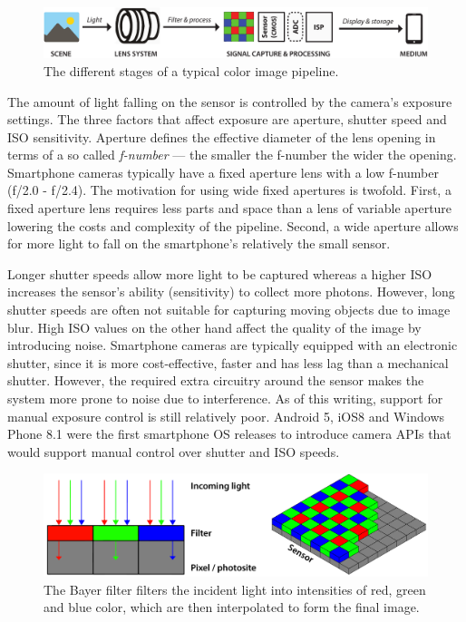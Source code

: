 \documentclass[thesis.tex]{subfiles}
\begin{document}
\begin{figure}[ht]
\centering \includegraphics[width=\textwidth]{images/pipeline}
\caption{The different stages of a typical color image pipeline.\label{figure:pipeline}}
\end{figure}

The amount of light falling on the sensor is controlled by the camera's exposure settings. The three factors that affect exposure are aperture, shutter speed and ISO sensitivity. Aperture defines the effective diameter of the lens opening in terms of a so called \textit{f-number} --- the smaller the f-number the wider the opening. Smartphone cameras typically have a fixed aperture lens with a low f-number (f/2.0 - f/2.4). The motivation for using wide fixed apertures is twofold. First, a fixed aperture lens requires less parts and space than a lens of variable aperture lowering the costs and complexity of the pipeline. Second, a wide aperture allows for more light to fall on the smartphone's relatively the small sensor.

Longer shutter speeds allow more light to be captured whereas a higher ISO increases the sensor's ability (sensitivity) to collect more photons. However, long shutter speeds are often not suitable for capturing moving objects due to image blur. High ISO values on the other hand affect the quality of the image by introducing noise. Smartphone cameras are typically equipped with an electronic shutter, since it is more cost-effective, faster and has less lag than a mechanical shutter. However, the required extra circuitry around the sensor makes the system more prone to noise due to interference. As of this writing, support for manual exposure control is still relatively poor. Android 5, iOS8 and Windows Phone 8.1 were the first smartphone OS releases to introduce camera APIs that would support manual control over shutter and ISO speeds.

\begin{figure}[ht]
\centering \includegraphics[width=\textwidth]{images/bayer}
\caption{The Bayer filter filters the incident light into intensities of red, green and blue color, which are then interpolated to form the final image. \label{figure:bayer}}
\end{figure}
\end{document}
